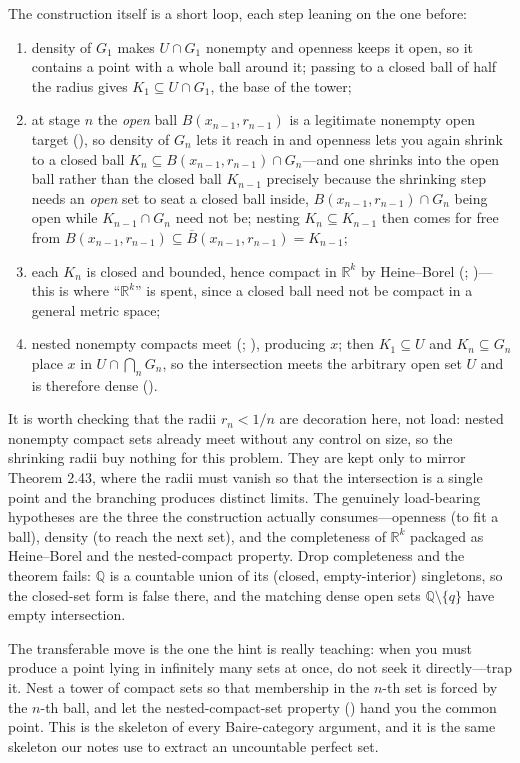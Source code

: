 \documentclass[main.tex]{subfiles}
\begin{document}
\begin{Reflection}
The construction itself is a short loop, each step leaning on the one before:
\begin{enumerate}[leftmargin=1.7em,itemsep=3pt,topsep=2pt,label=\textnormal{(\arabic*)}]
  \item density of $G_1$ makes $U\cap G_1$ nonempty and openness keeps it open, so it contains a point with a whole ball around it; passing to a closed ball of half the radius gives $K_1\subseteq U\cap G_1$, the base of the tower;
  \item at stage $n$ the \emph{open} ball $B(x_{n-1},r_{n-1})$ is a legitimate nonempty open target (), so density of $G_n$ lets it reach in and openness lets you again shrink to a closed ball $K_n\subseteq B(x_{n-1},r_{n-1})\cap G_n$---and one shrinks into the open ball rather than the closed ball $K_{n-1}$ precisely because the shrinking step needs an \emph{open} set to seat a closed ball inside, $B(x_{n-1},r_{n-1})\cap G_n$ being open while $K_{n-1}\cap G_n$ need not be; nesting $K_n\subseteq K_{n-1}$ then comes for free from $B(x_{n-1},r_{n-1})\subseteq\overline B(x_{n-1},r_{n-1})=K_{n-1}$;
  \item each $K_n$ is closed and bounded, hence compact in $\mathbb R^k$ by Heine--Borel (; )---this is where ``$\mathbb R^k$'' is spent, since a closed ball need not be compact in a general metric space;
  \item nested nonempty compacts meet (; ), producing $x$; then $K_1\subseteq U$ and $K_n\subseteq G_n$ place $x$ in $U\cap\bigcap_n G_n$, so the intersection meets the arbitrary open set $U$ and is therefore dense ().
\end{enumerate}

It is worth checking that the radii $r_n<1/n$ are decoration here, not load: nested nonempty compact sets already meet without any control on size, so the shrinking radii buy nothing for this problem. They are kept only to mirror Theorem 2.43, where the radii must vanish so that the intersection is a single point and the branching produces distinct limits. The genuinely load-bearing hypotheses are the three the construction actually consumes---openness (to fit a ball), density (to reach the next set), and the completeness of $\mathbb R^k$ packaged as Heine--Borel and the nested-compact property. Drop completeness and the theorem fails: $\mathbb Q$ is a countable union of its (closed, empty-interior) singletons, so the closed-set form is false there, and the matching dense open sets $\mathbb Q\setminus\{q\}$ have empty intersection.

The transferable move is the one the hint is really teaching: when you must produce a point lying in infinitely many sets at once, do not seek it directly---trap it. Nest a tower of compact sets so that membership in the $n$-th set is forced by the $n$-th ball, and let the nested-compact-set property () hand you the common point. This is the skeleton of every Baire-category argument, and it is the same skeleton our notes use to extract an uncountable perfect set.
\end{Reflection}
\end{document}
